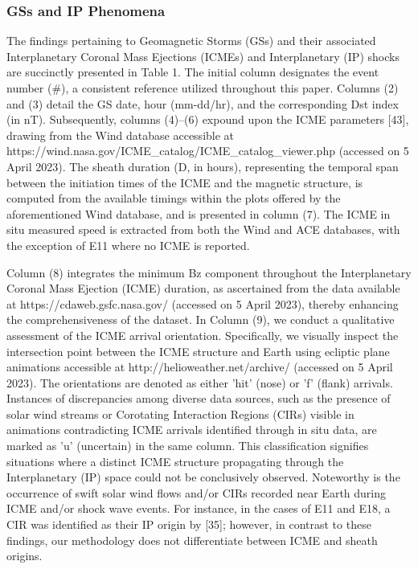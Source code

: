 \subsubsection{GSs and IP Phenomena}
The findings pertaining to Geomagnetic Storms (GSs) and their associated Interplanetary Coronal Mass Ejections (ICMEs) and Interplanetary (IP) shocks are succinctly presented in Table 1. The initial column designates the event number (#), a consistent reference utilized throughout this paper. Columns (2) and (3) detail the GS date, hour (mm-dd/hr), and the corresponding Dst index (in nT). Subsequently, columns (4)–(6) expound upon the ICME parameters [43], drawing from the Wind database accessible at https://wind.nasa.gov/ICME_catalog/ICME_catalog_viewer.php (accessed on 5 April 2023). The sheath duration (D, in hours), representing the temporal span between the initiation times of the ICME and the magnetic structure, is computed from the available timings within the plots offered by the aforementioned Wind database, and is presented in column (7). The ICME in situ measured speed is extracted from both the Wind and ACE databases, with the exception of E11 where no ICME is reported.

Column (8) integrates the minimum Bz component throughout the Interplanetary Coronal Mass Ejection (ICME) duration, as ascertained from the data available at https://cdaweb.gsfc.nasa.gov/ (accessed on 5 April 2023), thereby enhancing the comprehensiveness of the dataset. In Column (9), we conduct a qualitative assessment of the ICME arrival orientation. Specifically, we visually inspect the intersection point between the ICME structure and Earth using ecliptic plane animations accessible at http://helioweather.net/archive/ (accessed on 5 April 2023). The orientations are denoted as either 'hit' (nose) or 'f' (flank) arrivals. Instances of discrepancies among diverse data sources, such as the presence of solar wind streams or Corotating Interaction Regions (CIRs) visible in animations contradicting ICME arrivals identified through in situ data, are marked as 'u' (uncertain) in the same column. This classification signifies situations where a distinct ICME structure propagating through the Interplanetary (IP) space could not be conclusively observed. Noteworthy is the occurrence of swift solar wind flows and/or CIRs recorded near Earth during ICME and/or shock wave events. For instance, in the cases of E11 and E18, a CIR was identified as their IP origin by [35]; however, in contrast to these findings, our methodology does not differentiate between ICME and sheath origins.

